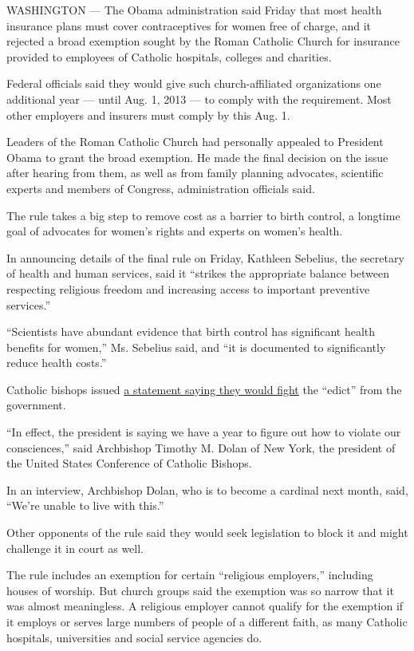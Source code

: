 WASHINGTON --- The Obama administration said Friday that most health
insurance plans must cover contraceptives for women free of charge, and
it rejected a broad exemption sought by the Roman Catholic Church for
insurance provided to employees of Catholic hospitals, colleges and
charities.

Federal officials said they would give such church-affiliated
organizations one additional year --- until Aug. 1, 2013 --- to comply
with the requirement. Most other employers and insurers must comply by
this Aug. 1.

Leaders of the Roman Catholic Church had personally appealed to
President Obama to grant the broad exemption. He made the final decision
on the issue after hearing from them, as well as from family planning
advocates, scientific experts and members of Congress, administration
officials said.

The rule takes a big step to remove cost as a barrier to birth control,
a longtime goal of advocates for women's rights and experts on women's
health.

In announcing details of the final rule on Friday, Kathleen Sebelius,
the secretary of health and human services, said it ``strikes the
appropriate balance between respecting religious freedom and increasing
access to important preventive services.''

``Scientists have abundant evidence that birth control has significant
health benefits for women,'' Ms. Sebelius said, and ``it is documented
to significantly reduce health costs.''

Catholic bishops issued \href{http://usccb.org/news/2012/12-012.cfm}{a
statement saying they would fight} the ``edict'' from the government.

``In effect, the president is saying we have a year to figure out how to
violate our consciences,'' said Archbishop Timothy M. Dolan of New York,
the president of the United States Conference of Catholic Bishops.

In an interview, Archbishop Dolan, who is to become a cardinal next
month, said, ``We're unable to live with this.''

Other opponents of the rule said they would seek legislation to block it
and might challenge it in court as well.

The rule includes an exemption for certain ``religious employers,''
including houses of worship. But church groups said the exemption was so
narrow that it was almost meaningless. A religious employer cannot
qualify for the exemption if it employs or serves large numbers of
people of a different faith, as many Catholic hospitals, universities
and social service agencies do.

